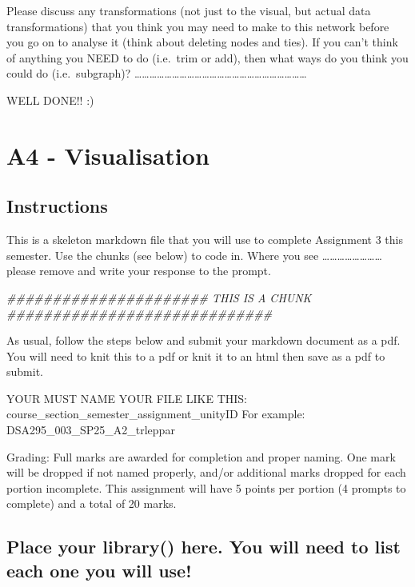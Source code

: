 \documentclass[
  letterpaper,
  DIV=11,
  numbers=noendperiod]{scrreprt}
\newenvironment{Shaded}{\begin{snugshade}}{\end{snugshade}}
\newcommand{\DocumentationTok}[1]{\textcolor[rgb]{0.37,0.37,0.37}{\textit{#1}}}
\begin{document}
Please discuss any transformations (not just to the visual, but actual
data transformations) that you think you may need to make to this
network before you go on to analyse it (think about deleting nodes and
ties). If you can't think of anything you NEED to do (i.e.~trim or add),
then what ways do you think you could do (i.e.~subgraph)?
\ldots\ldots\ldots\ldots\ldots\ldots\ldots\ldots\ldots\ldots\ldots\ldots\ldots\ldots\ldots\ldots\ldots\ldots\ldots\ldots\ldots\ldots\ldots{}

WELL DONE!! :)

\chapter{A4 - Visualisation}\label{a4---visualisation}

\section{Instructions}\label{instructions-1}

This is a skeleton markdown file that you will use to complete
Assignment 3 this semester. Use the chunks (see below) to code in. Where
you see \ldots\ldots\ldots\ldots\ldots\ldots\ldots\ldots{} please remove
and write your response to the prompt.

\begin{Shaded}
\begin{Highlighting}[]
\DocumentationTok{\#\#\#\#\#\#\#\#\#\#\#\#\#\#\#\#\#\#\#\#\#\# THIS IS A CHUNK \#\#\#\#\#\#\#\#\#\#\#\#\#\#\#\#\#\#\#\#\#\#\#\#\#\#\#\#\#}
\end{Highlighting}
\end{Shaded}

As usual, follow the steps below and submit your markdown document as a
pdf. You will need to knit this to a pdf or knit it to an html then save
as a pdf to submit.

YOUR MUST NAME YOUR FILE LIKE THIS:
course\_section\_semester\_assignment\_unityID For example:
DSA295\_003\_SP25\_A2\_trleppar

Grading: Full marks are awarded for completion and proper naming. One
mark will be dropped if not named properly, and/or additional marks
dropped for each portion incomplete. This assignment will have 5 points
per portion (4 prompts to complete) and a total of 20 marks.

\section{Place your library() here. You will need to list each one you
will
use!}\label{place-your-library-here.-you-will-need-to-list-each-one-you-will-use}
\end{document}
